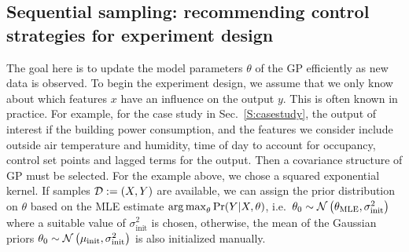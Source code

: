 \subsection{Sequential sampling: recommending control strategies for experiment design }

The goal here is to update the model parameters \(\theta\) of the GP efficiently as new data is observed. 
To begin the experiment design, we assume that we only know about which features \(x\) have an influence on the output \(y\). This is often known in practice. For example, for the case study in Sec.~\ref{S:casestudy}, the output of interest if the building power consumption, and the features we consider include outside air temperature and humidity, time of day to account for occupancy, control set points and lagged terms for the output. Then a covariance structure of GP must be selected. For the example above, we chose a squared exponential kernel.
If samples \(\mathcal{D} := (X,Y)\) are available, we can assign the prior distribution on \(\theta\) based on the MLE estimate \( \operatorname*{arg\,max}_\theta \Pr(Y \vert X, \theta)\), i.e.~\(\theta_{\mathrm{0}} \sim \operatorname*{\mathcal{N}}\left(\theta_{\mathrm{MLE}}, \sigma^2_{\mathrm{init}}\right)\) where a suitable value of \(\sigma^2_{\mathrm{init}}\) is chosen, otherwise, the mean of the Gaussian priors \(\theta_{\mathrm{0}} \sim \operatorname*{\mathcal{N}}\left(\mu_{\mathrm{{init}}}, \sigma^2_\mathrm{init}\right)\) is also initialized manually.

